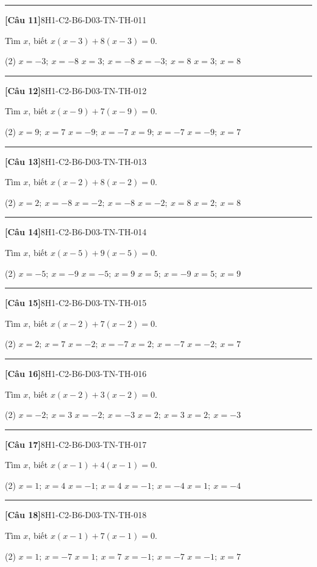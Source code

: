 \documentclass[12pt,a4paper]{article}
\newif\ifloigiai
\newenvironment{cauhoi}[2]{%
  \par\medskip\noindent\rule{\textwidth}{0.4pt}\par\nopagebreak
  \noindent\textbf{[#1]}\hfill{\scriptsize\ttfamily #2}\par\nopagebreak\smallskip}{\par}
\newcommand{\dapan}[1]{\ifloigiai\par\smallskip\noindent\textit{Đáp án:} \textbf{#1}\par\fi}
\begin{document}
\begin{cauhoi}{Câu 11}{8H1-C2-B6-D03-TN-TH-011}
Tìm $x$, biết $x(x-3)+8(x-3)=0$.
\begin{tasks}(2)
\task $x=-3;\ x=-8$
\task $x=3;\ x=-8$
\task $x=-3;\ x=8$
\task $x=3;\ x=8$
\end{tasks}
\dapan{B}
\end{cauhoi}
\begin{cauhoi}{Câu 12}{8H1-C2-B6-D03-TN-TH-012}
Tìm $x$, biết $x(x-9)+7(x-9)=0$.
\begin{tasks}(2)
\task $x=9;\ x=7$
\task $x=-9;\ x=-7$
\task $x=9;\ x=-7$
\task $x=-9;\ x=7$
\end{tasks}
\dapan{C}
\end{cauhoi}
\begin{cauhoi}{Câu 13}{8H1-C2-B6-D03-TN-TH-013}
Tìm $x$, biết $x(x-2)+8(x-2)=0$.
\begin{tasks}(2)
\task $x=2;\ x=-8$
\task $x=-2;\ x=-8$
\task $x=-2;\ x=8$
\task $x=2;\ x=8$
\end{tasks}
\dapan{A}
\end{cauhoi}
\begin{cauhoi}{Câu 14}{8H1-C2-B6-D03-TN-TH-014}
Tìm $x$, biết $x(x-5)+9(x-5)=0$.
\begin{tasks}(2)
\task $x=-5;\ x=-9$
\task $x=-5;\ x=9$
\task $x=5;\ x=-9$
\task $x=5;\ x=9$
\end{tasks}
\dapan{C}
\end{cauhoi}
\begin{cauhoi}{Câu 15}{8H1-C2-B6-D03-TN-TH-015}
Tìm $x$, biết $x(x-2)+7(x-2)=0$.
\begin{tasks}(2)
\task $x=2;\ x=7$
\task $x=-2;\ x=-7$
\task $x=2;\ x=-7$
\task $x=-2;\ x=7$
\end{tasks}
\dapan{C}
\end{cauhoi}
\begin{cauhoi}{Câu 16}{8H1-C2-B6-D03-TN-TH-016}
Tìm $x$, biết $x(x-2)+3(x-2)=0$.
\begin{tasks}(2)
\task $x=-2;\ x=3$
\task $x=-2;\ x=-3$
\task $x=2;\ x=3$
\task $x=2;\ x=-3$
\end{tasks}
\dapan{D}
\end{cauhoi}
\begin{cauhoi}{Câu 17}{8H1-C2-B6-D03-TN-TH-017}
Tìm $x$, biết $x(x-1)+4(x-1)=0$.
\begin{tasks}(2)
\task $x=1;\ x=4$
\task $x=-1;\ x=4$
\task $x=-1;\ x=-4$
\task $x=1;\ x=-4$
\end{tasks}
\dapan{D}
\end{cauhoi}
\begin{cauhoi}{Câu 18}{8H1-C2-B6-D03-TN-TH-018}
Tìm $x$, biết $x(x-1)+7(x-1)=0$.
\begin{tasks}(2)
\task $x=1;\ x=-7$
\task $x=1;\ x=7$
\task $x=-1;\ x=-7$
\task $x=-1;\ x=7$
\end{tasks}
\dapan{A}
\end{cauhoi}
\end{document}
